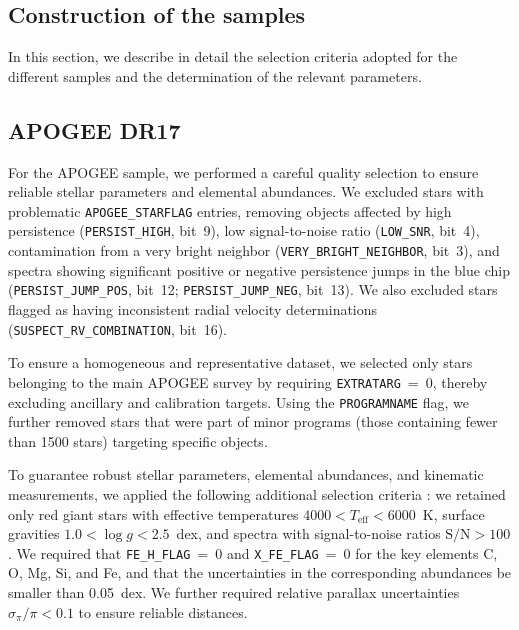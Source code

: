 \documentclass{aa}
\begin{document}
\begin{appendix}

\section{Construction of the samples} \label{target_selection}

In this section, we describe in detail the selection criteria adopted for the different samples and the determination of the relevant parameters.

\subsection{APOGEE DR17}

For the APOGEE sample, we performed a careful quality selection to ensure reliable stellar parameters and elemental abundances. We excluded stars with problematic \texttt{APOGEE\_STARFLAG} entries, removing objects affected by high persistence (\texttt{PERSIST\_HIGH}, bit~9), low signal-to-noise ratio (\texttt{LOW\_SNR}, bit~4), contamination from a very bright neighbor (\texttt{VERY\_BRIGHT\_NEIGHBOR}, bit~3), and spectra showing significant positive or negative persistence jumps in the blue chip (\texttt{PERSIST\_JUMP\_POS}, bit~12; \texttt{PERSIST\_JUMP\_NEG}, bit~13). We also excluded stars flagged as having inconsistent radial velocity determinations (\texttt{SUSPECT\_RV\_COMBINATION}, bit~16).

To ensure a homogeneous and representative dataset, we selected only stars belonging to the main APOGEE survey by requiring \texttt{EXTRATARG}~=~0, thereby excluding ancillary and calibration targets. Using the \texttt{PROGRAMNAME} flag, we further removed stars that were part of minor programs (those containing fewer than 1500 stars) targeting specific objects.

To guarantee robust stellar parameters, elemental abundances, and kinematic measurements, we applied the following additional selection criteria \citep[see e.g.,][]{Feltzing-23}: 
we retained only red giant stars with effective temperatures $4000 < T_{\mathrm{eff}} < 6000$~K, surface gravities $1.0 < \log g < 2.5$~dex, and spectra with signal-to-noise ratios $\mathrm{S/N} > 100$. We required that \texttt{FE\_H\_FLAG}~=~0 and \texttt{X\_FE\_FLAG}~=~0 for the key elements C, O, Mg, Si, and Fe, and that the uncertainties in the corresponding abundances be smaller than 0.05~dex. We further required relative parallax uncertainties $\sigma_\pi / \pi < 0.1$ to ensure reliable distances. 


\end{appendix}
\end{document}
